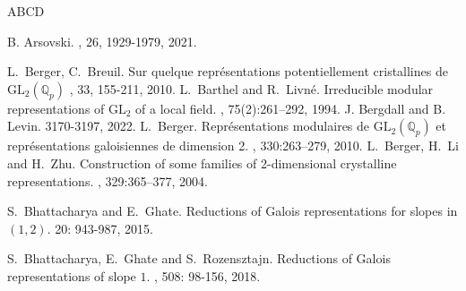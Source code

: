 \documentclass[11pt, reqno]{amsart}
\numberwithin{equation}{section}
\newcommand\Q{\mathbb{Q}}
\newcommand\GL{{\mathrm{GL}}}
\theoremstyle{definition}
\theoremstyle{remark}
\theoremstyle{definition}
\theoremstyle{remark}
\theoremstyle{remark}
\begin{document}
 \begin{thebibliography}{ABCD}

B. Arsovski.
, 
 26, 1929-1979, 2021.

		L.~Berger, C.~Breuil. \newblock Sur quelque repr\'esentations potentiellement cristallines de $\GL_{2}(\Q_{p})$
        , 33, 155-211, 2010.
L.~Barthel and R.~Livn\'e.
\newblock Irreducible modular representations of ${\mathrm {GL}}_2$ of a local field.
, 75(2):261--292, 1994.
J. Bergdall and B. Levin.
 3170-3197, 2022.
%
% 
L.~Berger.
\newblock Repr\'esentations modulaires de ${\mathrm {GL}}_2({\mathbb Q}_p)$ et repr\'esentations 
                 galoisiennes de dimension 2.
, 330:263--279, 2010.
L.~Berger, H.~Li and H.~Zhu.
\newblock Construction of some families of 2-dimensional crystalline representations.
, 329:365--377, 2004.

S.~Bhattacharya and E.~Ghate.
\newblock Reductions of Galois representations for slopes in $(1,2)$. 
 20: 943-987, 2015.

S.~Bhattacharya, E.~Ghate and S.~Rozensztajn.
\newblock Reductions of Galois representations of slope $1$. 
, 508: 98-156, 2018.


\end{thebibliography}
\end{document}
